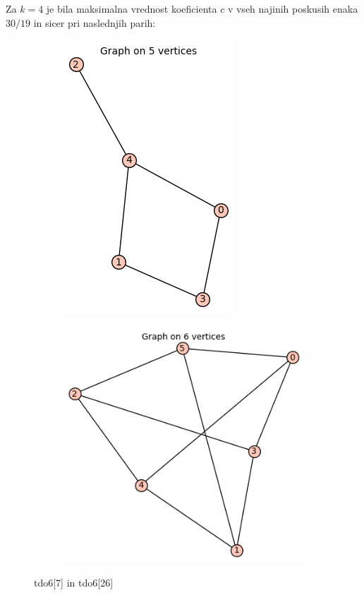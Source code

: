 \documentclass[12pt, a4paper]{article}
\begin{document}
Za $k=4$  je bila maksimalna vrednost koeficienta $c$ v vseh najinih poskusih enaka $30/19$ in sicer pri naslednjih parih: 
\begin{center}
\begin{figure}[!htb]
\centering
\begin{subfigure}{0.5\textwidth}
  \centering
  \includegraphics[width=0.3\linewidth]{tdo6[7]}
\end{subfigure}%
\begin{subfigure}{0.5\textwidth}
  \centering
  \includegraphics[width=0.44\linewidth]{tdo6[26]}
\end{subfigure}
\caption{tdo6[7] in tdo6[26]}
\label{fig:test}
\end{figure}


\end{center}
\end{document}
